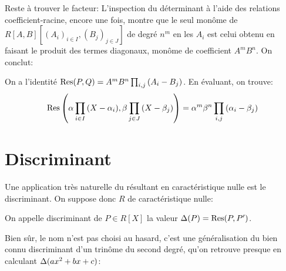 \documentclass{article}
\begin{document}
Reste à trouver le facteur: L'inspection du déterminant à l'aide des relations coefficient-racine, encore une fois, montre que le seul monôme de $R[A, B][(A_i)_{i \in I}, (B_j)_{j \in J}]$ de degré $n^m$ en les $A_i$ est celui obtenu en faisant le produit des termes diagonaux, monôme de coefficient $A^mB^n$. On conclut:

\begin{theoreme}
On a l'identité $\textrm{Res}(P, Q) = A^mB^n\prod_{i, j}{(A_i-B_j)}$. En évaluant, on trouve:
$$\textrm{Res}\left(\alpha \prod_{i \in I}{(X-\alpha_i)}, \beta\prod_{j \in J}{(X-\beta_j)}\right) =  \alpha^m\beta^n\prod_{i, j}{(\alpha_i-\beta_j)}$$
\end{theoreme}

\section{Discriminant}

Une application très naturelle du résultant en caractéristique nulle est le discriminant. On suppose donc $R$ de caractéristique nulle:

\begin{definition}
On appelle discriminant de $P \in R[X]$ la valeur $\Delta(P) = \textrm{Res}(P, P')$.
\end{definition}

Bien sûr, le nom n'est pas choisi au hasard, c'est une généralisation du bien connu discriminant d'un trinôme du second degré, qu'on retrouve presque en calculant $\Delta(ax^2 + bx + c)$:
\end{document}
